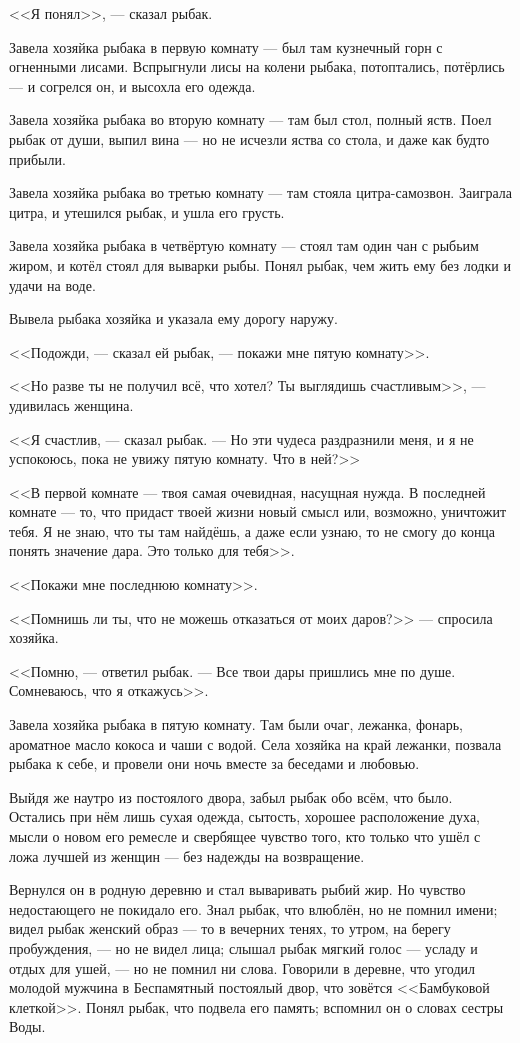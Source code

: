 <<Я понял>>, --- сказал рыбак.

Завела хозяйка рыбака в первую комнату --- был там кузнечный горн с огненными лисами.
Вспрыгнули лисы на колени рыбака, потоптались, потёрлись --- и согрелся он, и высохла его одежда.

Завела хозяйка рыбака во вторую комнату --- там был стол, полный яств.
Поел рыбак от души, выпил вина --- но не исчезли яства со стола, и даже как будто прибыли.

Завела хозяйка рыбака во третью комнату --- там стояла цитра-самозвон.
Заиграла цитра, и утешился рыбак, и ушла его грусть.

Завела хозяйка рыбака в четвёртую комнату --- стоял там один чан с рыбьим жиром, и котёл стоял для выварки рыбы.
Понял рыбак, чем жить ему без лодки и удачи на воде.

Вывела рыбака хозяйка и указала ему дорогу наружу.

<<Подожди, --- сказал ей рыбак, --- покажи мне пятую комнату>>.

<<Но разве ты не получил всё, что хотел?
Ты выглядишь счастливым>>, --- удивилась женщина.

<<Я счастлив, --- сказал рыбак.
--- Но эти чудеса раздразнили меня, и я не успокоюсь, пока не увижу пятую комнату.
Что в ней?>>

<<В первой комнате --- твоя самая очевидная, насущная нужда.
В последней комнате --- то, что придаст твоей жизни новый смысл или, возможно, уничтожит тебя.
Я не знаю, что ты там найдёшь, а даже если узнаю, то не смогу до конца понять значение дара.
Это только для тебя>>.

<<Покажи мне последнюю комнату>>.

<<Помнишь ли ты, что не можешь отказаться от моих даров?>> --- спросила хозяйка.

<<Помню, --- ответил рыбак.
--- Все твои дары пришлись мне по душе.
Сомневаюсь, что я откажусь>>.

Завела хозяйка рыбака в пятую комнату.
Там были очаг, лежанка, фонарь, ароматное масло кокоса и чаши с водой.
Села хозяйка на край лежанки, позвала рыбака к себе, и провели они ночь вместе за беседами и любовью.

Выйдя же наутро из постоялого двора, забыл рыбак обо всём, что было.
Остались при нём лишь сухая одежда, сытость, хорошее расположение духа, мысли о новом его ремесле и свербящее чувство того, кто только что ушёл с ложа лучшей из женщин --- без надежды на возвращение.

Вернулся он в родную деревню и стал вываривать рыбий жир.
Но чувство недостающего не покидало его.
Знал рыбак, что влюблён, но не помнил имени;
видел рыбак женский образ --- то в вечерних тенях, то утром, на берегу пробуждения, --- но не видел лица;
слышал рыбак мягкий голос --- усладу и отдых для ушей, --- но не помнил ни слова.
Говорили в деревне, что угодил молодой мужчина в Беспамятный постоялый двор, что зовётся <<Бамбуковой клеткой>>.
Понял рыбак, что подвела его память;
вспомнил он о словах сестры Воды.

